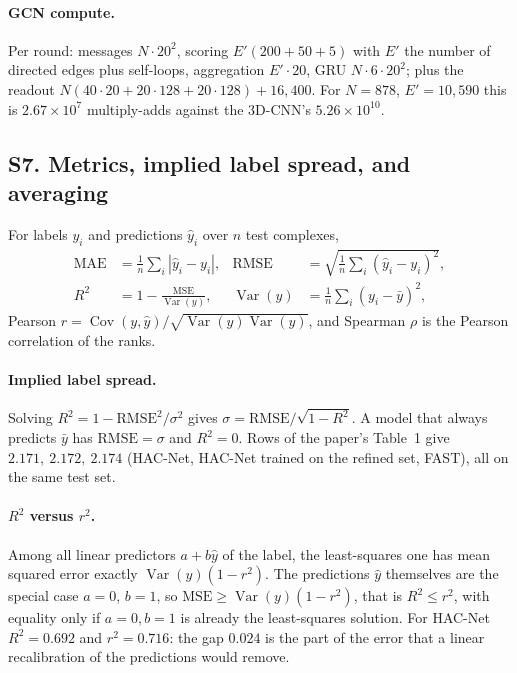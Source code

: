\documentclass[11pt]{article}
\DeclareMathOperator{\Var}{Var}
\DeclareMathOperator{\Cov}{Cov}
\begin{document}
\paragraph{GCN compute.} Per round: messages $N\cdot20^2$, scoring $E'(200+50+5)$ with $E'$ the number of directed edges plus self-loops, aggregation $E'\cdot20$, GRU $N\cdot6\cdot20^2$; plus the readout $N(40\cdot20+20\cdot128+20\cdot128)+16{,}400$. For $N=878$, $E'=10{,}590$ this is $2.67\times10^7$ multiply-adds against the 3D-CNN's $5.26\times10^{10}$.

\label{sec:S7}
\subsection*{S7. Metrics, implied label spread, and averaging}
For labels $y_i$ and predictions $\hat y_i$ over $n$ test complexes,
\begin{align*}
  \mathrm{MAE}&=\frac1n\sum_i|\hat y_i-y_i|, & \mathrm{RMSE}&=\sqrt{\frac1n\sum_i(\hat y_i-y_i)^2},\\
  R^2&=1-\frac{\mathrm{MSE}}{\Var(y)}, & \Var(y)&=\frac1n\sum_i(y_i-\bar y)^2,
\end{align*}
Pearson $r=\Cov(y,\hat y)/\sqrt{\Var(y)\Var(\hat y)}$, and Spearman $\rho$ is the Pearson correlation of the ranks.

\paragraph{Implied label spread.} Solving $R^2=1-\mathrm{RMSE}^2/\sigma^2$ gives $\sigma=\mathrm{RMSE}/\sqrt{1-R^2}$. A model that always predicts $\bar y$ has $\mathrm{RMSE}=\sigma$ and $R^2=0$. Rows of the paper's Table~1 give $2.171,\ 2.172,\ 2.174$ (HAC-Net, HAC-Net trained on the refined set, FAST), all on the same test set.

\paragraph{$R^2$ versus $r^2$.} Among all linear predictors $a+b\hat y$ of the label, the least-squares one has mean squared error exactly $\Var(y)(1-r^2)$. The predictions $\hat y$ themselves are the special case $a=0$, $b=1$, so $\mathrm{MSE}\ge\Var(y)(1-r^2)$, that is $R^2\le r^2$, with equality only if $a=0,b=1$ is already the least-squares solution. For HAC-Net $R^2=0.692$ and $r^2=0.716$: the gap $0.024$ is the part of the error that a linear recalibration of the predictions would remove.
\end{document}
